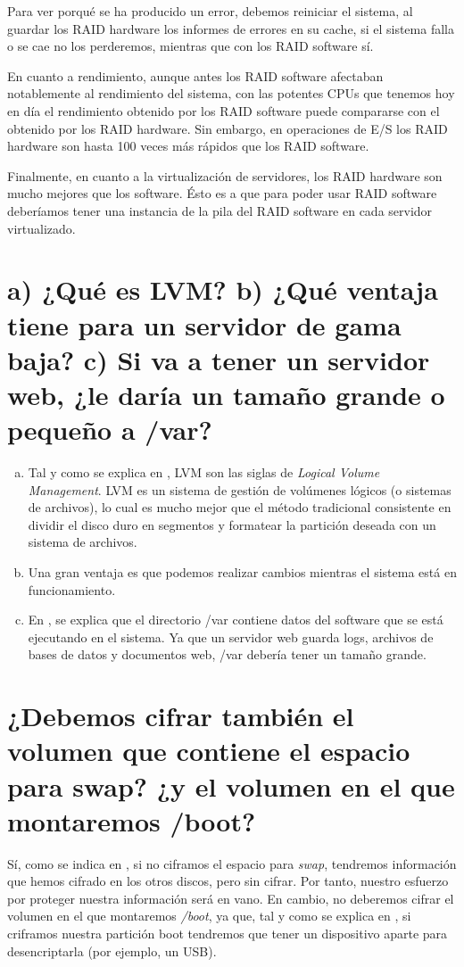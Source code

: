 \documentclass[10pt,a4paper,spanish]{article}
\numberwithin{equation}{section} %
\numberwithin{figure}{section} %
\numberwithin{table}{section} %
\begin{document}
Para ver porqué se ha producido un error, debemos reiniciar el sistema, al guardar los RAID hardware los informes de errores en su cache, si el sistema falla o se cae no los perderemos, mientras que con los RAID software sí.

En cuanto a rendimiento, aunque antes los RAID software afectaban notablemente al rendimiento del sistema, con las potentes CPUs que tenemos hoy en día el rendimiento obtenido por los RAID software puede compararse con el obtenido por los RAID hardware. Sin embargo, en operaciones de E/S los RAID hardware son hasta 100 veces más rápidos que los RAID software.

Finalmente, en cuanto a la virtualización de servidores, los RAID hardware son mucho mejores que los software. Ésto es a que para poder usar RAID software deberíamos tener una instancia de la pila del RAID software en cada servidor virtualizado.

\section{a) ¿Qué es LVM? b) ¿Qué ventaja tiene para un servidor de gama baja? c) Si va a tener un servidor web, ¿le daría un tamaño grande o pequeño a /var?}
\begin{enumerate}[a)]
    \item Tal y como se explica en \cite{lvmubuntu}, LVM son las siglas de \textit{Logical Volume Management}. LVM es un sistema de gestión de volúmenes lógicos (o sistemas de archivos), lo cual es mucho mejor que el método tradicional consistente en dividir el disco duro en segmentos y formatear la partición deseada con un sistema de archivos.
    \item Una gran ventaja es que podemos realizar cambios mientras el sistema está en funcionamiento.
    \item En \cite{linuxvar}, se explica que el directorio /var contiene datos del software que se está ejecutando en el sistema. Ya que un servidor web guarda logs, archivos de bases de datos y documentos web, /var debería tener un tamaño grande.
\end{enumerate}

\section{¿Debemos cifrar también el volumen que contiene el espacio para swap? ¿y el volumen en el que montaremos /boot?}
Sí, como se indica en \cite{enswap}, si no ciframos el espacio para \textit{swap}, tendremos información que hemos cifrado en los otros discos, pero sin cifrar. Por tanto, nuestro esfuerzo por proteger nuestra información será en vano. En cambio, no deberemos cifrar el volumen en el que montaremos \textit{/boot}, ya que, tal y como se explica en \cite{enboot}, si criframos nuestra partición boot tendremos que tener un dispositivo aparte para desencriptarla (por ejemplo, un USB).
\end{document}
